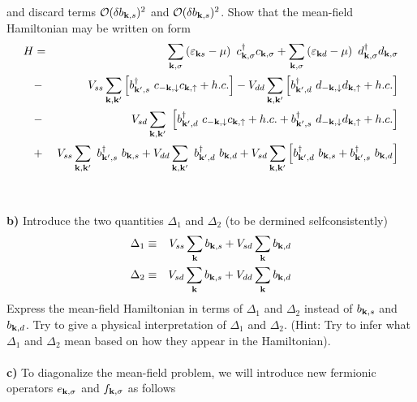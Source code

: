 \documentclass{article}
\begin{document}
and discard terms ${\cal O} (\delta b_{{\bf k},s})^2$ and ${\cal O} (\delta b_{{\bf k},s})^2$. Show that the mean-field Hamiltonian may be written on form
\begin{eqnarray}
H&  = &  \sum_{{\bf k},\sigma} \left( \varepsilon_{{\bf k} s} - \mu \right) ~ c^{\dagger}_{{\bf k},\sigma} c_{{\bf k},\sigma}
+  \sum_{{\bf k},\sigma} \left( \varepsilon_{{\bf k} d} - \mu \right)  ~ d^{\dagger}_{{\bf k},\sigma} d_{{\bf k},\sigma} \nonumber \\
& - &  V_{ss} \sum_{{\bf k},{\bf k}^{\prime}} 
\left[ b^{\dagger}_{{\bf k}^{\prime},s} ~ c_{-{\bf k},\downarrow}c_{{\bf k},\uparrow} + h.c. \right] 
- V_{dd} \sum_{{\bf k},{\bf k}^{\prime}} 
\left[ b^{\dagger}_{{\bf k}^{\prime},d} ~ d_{-{\bf k},\downarrow} d_{{\bf k},\uparrow} + h.c. \right] \nonumber \\
& - & V_{sd} \sum_{{\bf k},{\bf k}^{\prime}} ~
\left[ b^{\dagger}_{{\bf k}^{\prime},d} ~c_{-{\bf k},\downarrow} c_{{\bf k},\uparrow} + h.c. 
+
 b^{\dagger}_{{\bf k}^{\prime},s} ~d_{-{\bf k},\downarrow} d_{{\bf k},\uparrow}  + h.c. \right] \nonumber \\
 & + &
  V_{ss}\sum_{{\bf k},{\bf k}^{\prime}} ~b^{\dagger}_{{\bf k}^{\prime},s}~b_{{\bf k},s}
  +
    V_{dd}\sum_{{\bf k},{\bf k}^{\prime}} ~b^{\dagger}_{{\bf k}^{\prime},d}~b_{{\bf k},d}
+
  V_{sd}\sum_{{\bf k},{\bf k}^{\prime}}
\left[ b^{\dagger}_{{\bf k}^{\prime},d}~b_{{\bf k},s} + b^{\dagger}_{{\bf k}^{\prime},s}~b_{{\bf k},d}  \right]  \nonumber
\end{eqnarray}
\ \\
\ \\
{\bf b)} Introduce the two quantities $\Delta_1$ and $\Delta_2$ (to be dermined selfconsistently)
\begin{eqnarray}
\Delta_1 & \equiv & V_{ss} \sum_{\bf k}b_{{\bf k},s} + V_{sd} \sum_{\bf k} b_{{\bf k},d} \nonumber \\
\Delta_2 & \equiv & V_{sd} \sum_{\bf k}b_{{\bf k},s} + V_{dd} \sum_{\bf k} b_{{\bf k},d} \nonumber
\end{eqnarray}
Express the mean-field Hamiltonian in terms of $\Delta_1$ and $\Delta_2$ instead of $b_{{\bf k},s}$ and $b_{{\bf k},d}$. 
Try to give  a physical interpretation of  $\Delta_1$ and $\Delta_2$. (Hint: Try to infer what $\Delta_1$ and $\Delta_2$ mean based on how they appear in the Hamiltonian). 
\ \\
\ \\
{\bf c)} To diagonalize the mean-field problem, we will introduce new fermionic operators $e_{{\bf k},\sigma}$ and $f_{{\bf k},\sigma}$ as follows
\end{document}
